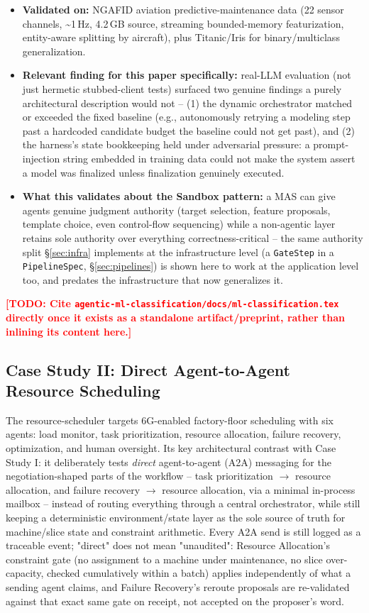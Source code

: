 \documentclass[10pt,conference]{IEEEtran}
\newcommand{\todo}[1]{\textcolor{red}{\textbf{[TODO: #1]}}}
\begin{document}
\begin{itemize}
  \item \textbf{Validated on:} NGAFID aviation predictive-maintenance data
  (22 sensor channels, \textasciitilde1\,Hz, 4.2\,GB source, streaming
  bounded-memory featurization, entity-aware splitting by aircraft), plus
  Titanic/Iris for binary/multiclass generalization.
  \item \textbf{Relevant finding for this paper specifically:} real-LLM
  evaluation (not just hermetic stubbed-client tests) surfaced two genuine
  findings a purely architectural description would not -- (1) the dynamic
  orchestrator matched or exceeded the fixed baseline (e.g., autonomously
  retrying a modeling step past a hardcoded candidate budget the baseline
  could not get past), and (2) the harness's state bookkeeping held under
  adversarial pressure: a prompt-injection string embedded in training
  data could not make the system assert a model was finalized unless
  finalization genuinely executed.
  \item \textbf{What this validates about the Sandbox pattern:} a MAS can
  give agents genuine judgment authority (target selection, feature
  proposals, template choice, even control-flow sequencing) while a
  non-agentic layer retains sole authority over everything
  correctness-critical -- the same authority split \S\ref{sec:infra}
  implements at the infrastructure level (a \texttt{GateStep} in a
  \texttt{PipelineSpec}, \S\ref{sec:pipelines}) is shown here to work at
  the application level too, and predates the infrastructure that now
  generalizes it.
\end{itemize}
\todo{Cite \texttt{agentic-ml-classification/docs/ml-classification.tex}
directly once it exists as a standalone artifact/preprint, rather than
inlining its content here.}

\subsection{Case Study II: Direct Agent-to-Agent Resource Scheduling}
\label{sec:casestudy2}
The resource-scheduler targets 6G-enabled factory-floor scheduling with six
agents: load monitor, task prioritization, resource allocation, failure
recovery, optimization, and human oversight. Its key architectural contrast
with Case Study I: it deliberately tests \emph{direct} agent-to-agent (A2A)
messaging for the negotiation-shaped parts of the workflow -- task
prioritization $\to$ resource allocation, and failure recovery $\to$
resource allocation, via a minimal in-process mailbox -- instead of routing
everything through a central orchestrator, while still keeping a
deterministic environment/state layer as the sole source of truth for
machine/slice state and constraint arithmetic. Every A2A send is still
logged as a traceable event; "direct" does not mean "unaudited": Resource
Allocation's constraint gate (no assignment to a machine under maintenance,
no slice over-capacity, checked cumulatively within a batch) applies
independently of what a sending agent claims, and Failure Recovery's
reroute proposals are re-validated against that exact same gate on receipt,
not accepted on the proposer's word.
\end{document}
